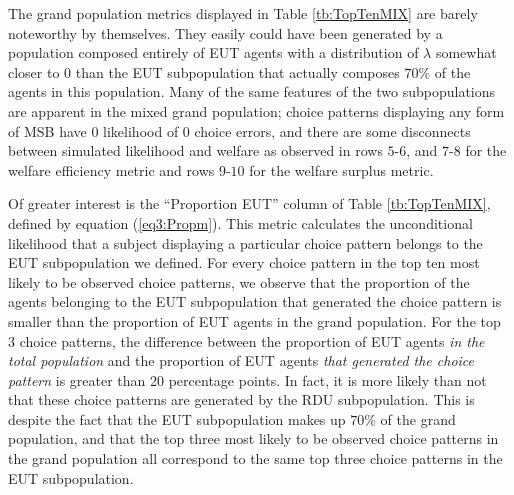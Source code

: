 \documentclass[../main.tex]{subfiles}
\begin{document}
The grand population metrics displayed in Table \ref{tb:TopTenMIX} are barely noteworthy by themselves.
They easily could have been generated by a population composed entirely of EUT agents with a distribution of $\lambda$ somewhat closer to $0$ than the EUT subpopulation that actually composes $70\%$ of the agents in this population.
Many of the same features of the two subpopulations are apparent in the mixed grand population;
choice patterns displaying any form of MSB have $0$ likelihood of $0$ choice errors, and there are some disconnects between simulated likelihood and welfare as observed in rows $5$-$6$, and $7$-$8$ for the welfare efficiency metric and rows $9$-$10$ for the welfare surplus metric.

Of greater interest is the \enquote{Proportion EUT} column of Table \ref{tb:TopTenMIX}, defined by equation (\ref{eq3:Propm}).
This metric calculates the unconditional likelihood that a subject displaying a particular choice pattern belongs to the EUT subpopulation we defined.
For every choice pattern in the top ten most likely to be observed choice patterns, we observe that the proportion of the agents belonging to the EUT subpopulation that generated the choice pattern is smaller than the proportion of EUT agents in the grand population.
For the top 3 choice patterns, the difference between the proportion of EUT agents \textit{in the total population} and the proportion of EUT agents \textit{that generated the choice pattern} is greater than 20 percentage points.
In fact, it is more likely than not that these choice patterns are generated by the RDU subpopulation.
This is despite the fact that the EUT subpopulation makes up $70\%$ of the grand population, and that the top three most likely to be observed choice patterns in the grand population all correspond to the same top three choice patterns in the EUT subpopulation.


\end{document}
